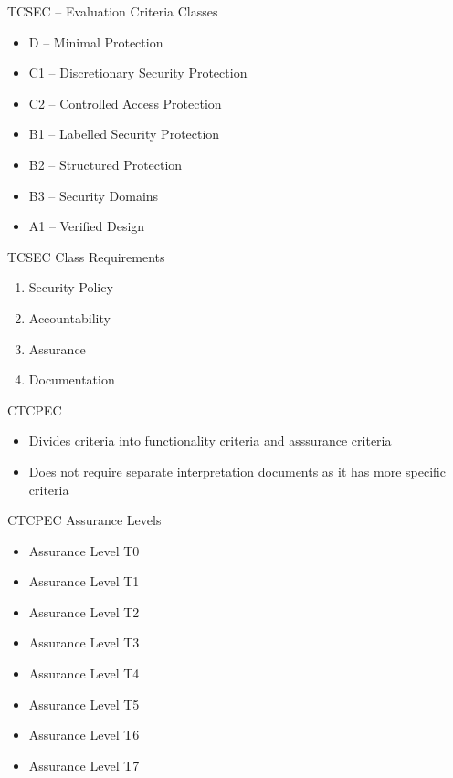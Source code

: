 \documentclass[xcolor=dvipsname,t]{beamer}
\begin{document}
\begin{frame} {TCSEC -- Evaluation Criteria Classes}
    \begin{itemize}
        \item D -- Minimal Protection
        \item C1 -- Discretionary Security Protection
        \item C2 -- Controlled Access Protection
        \item B1 -- Labelled Security Protection
        \item B2 -- Structured Protection
        \item B3 -- Security Domains
        \item A1 -- Verified Design
    \end{itemize}
\end{frame}

\begin{frame} {TCSEC Class Requirements} 
    \begin{enumerate}
        \item Security Policy
        \item Accountability
        \item Assurance
        \item Documentation
    \end{enumerate}
\end{frame}

\begin{frame} {CTCPEC}
    \begin{itemize}
        \item Divides criteria into functionality criteria
              and asssurance criteria
        \item Does not require separate interpretation documents 
              as it has more specific criteria
    \end{itemize}
\end{frame}

\begin{frame} {CTCPEC Assurance Levels}
    \begin{itemize}
        \item Assurance Level T0
        \item Assurance Level T1
        \item Assurance Level T2
        \item Assurance Level T3
        \item Assurance Level T4
        \item Assurance Level T5
        \item Assurance Level T6
        \item Assurance Level T7
    \end{itemize}
\end{frame}
\end{document}
